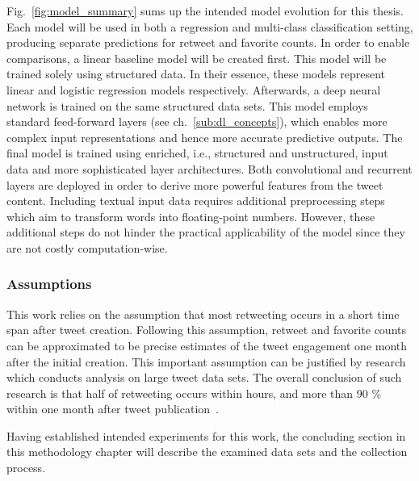 Fig.~\ref{fig:model_summary} sums up the intended model evolution for this thesis.
Each model will be used in both a regression and multi-class classification
setting, producing separate predictions for retweet and favorite counts.
In order to enable comparisons, a linear baseline model will be created first.
This model will be trained solely using structured data.
In their essence, these models represent linear and logistic regression models
respectively.
Afterwards, a deep neural network is trained on the same structured data sets.
This model employs standard feed-forward layers (see ch.~\ref{sub:dl_concepts}),
which enables more complex input representations and hence more accurate
predictive outputs.
The final model is trained using enriched, i.e., structured and unstructured,
input data and more sophisticated layer architectures.
Both convolutional and recurrent layers are deployed in order to derive more
powerful features from the tweet content. 
Including textual input data requires additional preprocessing steps which aim
to transform words into floating-point numbers.
However, these additional steps do not hinder the practical applicability
of the model since they are not costly computation-wise.

\subsubsection{Assumptions}

This work relies on the assumption that most retweeting occurs in a short time
span after tweet creation.
Following this assumption, retweet and favorite counts can be approximated
to be precise estimates of the tweet engagement one month after the initial
creation.
This important assumption can be justified by research which conducts analysis
on large tweet data sets.
The overall conclusion of such research is that half of retweeting occurs within
hours, and more than 90 \% within one month after tweet publication~\cite{Kwak2010, Kupavskii2012, Zaman2014}.

Having established intended experiments for this work, the concluding section
in this methodology chapter will describe the examined data sets and the
collection process.
